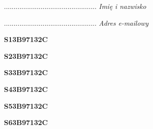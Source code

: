 \begin{turn}{90}\begin{minipage}{\linewidth} \vspace{20mm} ................................................  \textit{Imię i nazwisko}\end{minipage}\end{turn}

\begin{turn}{90}\begin{minipage}{\linewidth} \vspace{20mm} ................................................  \textit{Adres e-mailowy}\end{minipage}\end{turn}

\begin{turn}{90}\huge \begin{minipage}{\linewidth} \vspace{10mm}\textbf{S13B97132C}\end{minipage}\end{turn}

\begin{turn}{90}\huge \begin{minipage}{\linewidth} \vspace{10mm}\textbf{S23B97132C}\end{minipage}\end{turn}

\begin{turn}{90}\huge \begin{minipage}{\linewidth} \vspace{10mm}\textbf{S33B97132C}\end{minipage}\end{turn}

\begin{turn}{90}\huge \begin{minipage}{\linewidth} \vspace{10mm}\textbf{S43B97132C}\end{minipage}\end{turn}

\begin{turn}{90}\huge \begin{minipage}{\linewidth} \vspace{10mm}\textbf{S53B97132C}\end{minipage}\end{turn}

\begin{turn}{90}\huge \begin{minipage}{\linewidth} \vspace{10mm}\textbf{S63B97132C}\end{minipage}\end{turn}

